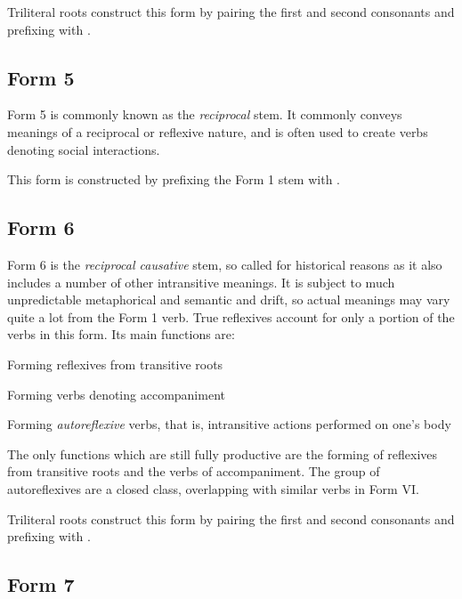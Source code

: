 \documentclass[grammar]{subfiles}
\begin{document}
  Triliteral roots construct this form by pairing the first and second consonants and prefixing with .

  \subsection{Form 5}
  \label{ssec:dev_verb_form_5}

  Form 5 is commonly known as the \emph{reciprocal} stem. 
  It commonly conveys meanings of a reciprocal or reflexive nature, and is often used to create verbs denoting social interactions.

  This form is constructed by prefixing the Form 1 stem with .

  \subsection{Form 6}
  \label{ssec:dev_verb_form_6}

  Form 6 is the \emph{reciprocal causative} stem, so called for historical reasons as it also includes a number of other intransitive meanings. 
  It is subject to much unpredictable metaphorical and semantic and drift, so actual meanings may vary quite a lot from the Form 1 verb.
  True reflexives account for only a portion of the verbs in this form. 
  Its main functions are: 

  \begin{itemize*}
    \item Forming reflexives from transitive roots
    \item Forming verbs denoting accompaniment
    \item Forming \emph{autoreflexive} verbs, that is, intransitive actions performed on one’s body
  \end{itemize*}

  The only functions which are still fully productive are the forming of reflexives from transitive roots and the verbs of accompaniment. 
  The group of autoreflexives are a closed class, overlapping with similar verbs in Form VI.

  Triliteral roots construct this form by pairing the first and second consonants and prefixing with . 

  \subsection{Form 7}
  \label{ssec:dev_verb_form_7}
\end{document}
